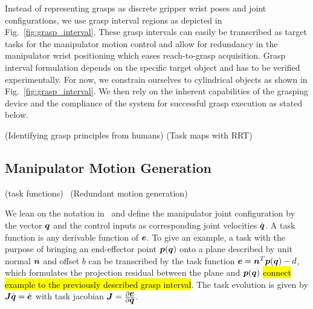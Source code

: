  Instead of representing grasps as discrete gripper wrist poses and joint
configurations, we use grasp interval regions as depicted in Fig.~\ref{fig:grasp_interval}. These
grasp intervals can easily be transcribed as target tasks for the manipulator motion control and
allow for redundancy in the manipulator wrist positioning which eases reach-to-grasp
acquisition. Grasp interval formulation depends on the specific target object and has to be verified
experimentally. For now, we constrain ourselves to cylindrical objects as shown in
Fig.~\ref{fig:grasp_interval}. We then rely on the inherent capabilities of the grasping device and
the compliance of the system for successful grasp execution as stated below.


\cite{Bala12}(Identifying grasp principles from humans) \cite{Gien08a, Gien08b, Vahr10}(Task maps with RRT)
%
\subsection{Manipulator Motion Generation}
\label{subsec:manip_motion}
%
 \cite{Sams91}(task functions)
~\cite{Sici91, Sent10}(Redundant motion generation)

We lean on the notation in~\cite{Esca14} and define the manipulator joint configuration by the
vector $\mbox{\boldmath $q$}$ and the control inputs as corresponding joint velocities $\dot{\mbox{\boldmath $q$}}$. A task
function is any derivable function of $\mbox{\boldmath $e$}$. To give an example, a task with the purpose of
bringing an end-effector point $\mbox{\boldmath $p$}(\mbox{\boldmath $q$})$ onto a plane described by unit normal $\mbox{\boldmath $n$}$
and offset $b$ can be transcribed by the task function $\mbox{\boldmath $e$}=\mbox{\boldmath $n$}^T\mbox{\boldmath $p$}(\mbox{\boldmath $q$})-d$, which
formulates the projection residual between the plane and $\mbox{\boldmath $p$}(\mbox{\boldmath $q$})$ \hl{connect example to
  the previously described grasp interval}. The task evolution is given by
$\mbox{\boldmath $J$}\dot{\mbox{\boldmath $q$}}=\dot{\mbox{\boldmath $e$}}$ with task jacobian
$\mbox{\boldmath $J$}=\frac{\partial\mbox{\boldmath $e$}}{\partial\mbox{\boldmath $q$}}$.

